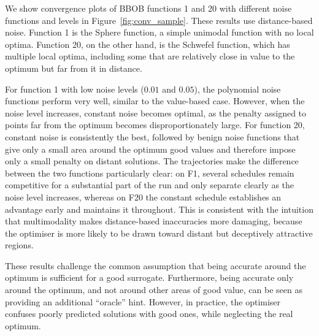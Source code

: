 {We show convergence plots of BBOB functions 1 and 20 with different noise functions and levels in Figure~\ref{fig:conv_sample}. These results use distance-based noise. Function 1 is the Sphere function, a simple unimodal function with no local optima. Function 20, on the other hand, is the Schwefel function, which has multiple local optima, including some that are relatively close in value to the optimum but far from it in distance.

For function 1 with low noise levels ($0.01$ and $0.05$), the polynomial noise functions perform very well, similar to the value-based case. However, when the noise level increases, constant noise becomes optimal, as the penalty assigned to points far from the optimum becomes disproportionately large. For function 20, constant noise is consistently the best, followed by benign noise functions that give only a small area around the optimum good values and therefore impose only a small penalty on distant solutions.
The trajectories make the difference between the two functions particularly clear: on F1, several schedules remain competitive for a substantial part of the run and only separate clearly as the noise level increases, whereas on F20 the constant schedule establishes an advantage early and maintains it throughout. This is consistent with the intuition that multimodality makes distance-based inaccuracies more damaging, because the optimiser is more likely to be drawn toward distant but deceptively attractive regions.

These results challenge the common assumption that being accurate around the optimum is sufficient for a good surrogate. Furthermore, being accurate only around the optimum, and not around other areas of good value, can be seen as providing an additional ``oracle'' hint. However, in practice, the optimiser confuses poorly predicted solutions with good ones, while neglecting the real optimum.



}
